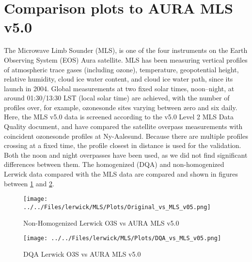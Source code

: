 \documentclass{article}
\begin{document}
\section{Comparison plots to AURA MLS v5.0}
The Microwave Limb Sounder (MLS), is one of the four instruments on the Earth Observing System (EOS) Aura satellite.
MLS has been measuring vertical profiles of atmospheric trace gases (including
ozone), temperature, geopotential height, relative humidity,
cloud ice water content, and cloud ice water path, since its
launch in 2004. Global measurements at two fixed solar
times, noon–night, at around 01:30/13:30 LST (local solar
time) are achieved, with the number of profiles over, for example, ozonesonde sites varying between zero and six daily.
Here, the MLS v5.0 data is screened according
to the v5.0 Level 2 MLS Data Quality document, and have compared the satellite overpass measurements
with coincident ozonesonde profiles at Ny-Aalesund. Because
there are multiple profiles crossing at a fixed time,
the profile closest in distance is used for the validation. Both
the noon and night overpasses have been used, as we did
not find significant differences between them.
The homogenized (DQA) and non-homogenized  Lerwick data compared with the MLS data are compared
and shown in figures between
\ref{fig:niwav04} and \ref{fig:dqav04_rs80}.

\begin{figure}
\centering
\texttt{[image: ../../Files/lerwick/MLS/Plots/Original\_vs\_MLS\_v05.png]}
\caption{ Non-Homogenized Lerwick O3S vs AURA MLS v5.0  }
\label{fig:niwav04}
\end{figure}


\begin{figure}
\centering
\texttt{[image: ../../Files/lerwick/MLS/Plots/DQA\_vs\_MLS\_v05.png]}
\caption{DQA Lerwick O3S vs AURA MLS v5.0 }
\label{fig:dqav04_rs80}
\end{figure}
\end{document}
